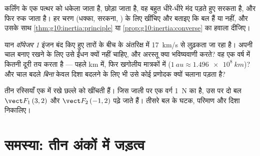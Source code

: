 \begin{exercise}[$\star\star\star$]\label{exo:g10:inertia:13}
कर्लिंग के एक पत्थर को धकेला जाता है, छोड़ा जाता है, वह बहुत धीरे-धीरे
मंद पड़ते हुए सरकता है, और फिर रुक जाता है। हर चरण (धक्का, सरकना, )
के लिए  खींचिए और बताइए कि बल
 हैं या नहीं, और उसके साथ \cref{thm:g10:inertia:principle} या \cref{prop:g10:inertia:converse} का हवाला
दीजिए।
\end{exercise}

\begin{exercise}[$\star\star\star$]\label{exo:g10:inertia:14}
यान \emph{वॉयेजर 1} इंजन बंद किए हुए तारों के बीच के अंतरिक्ष में \qty{17}{km/s}
से लुढ़कता जा रहा है। अपनी चाल बनाए रखने के लिए उसे ईंधन क्यों नहीं
चाहिए, और अरस्तू क्या भविष्यवाणी करते? वह एक वर्ष में कितनी दूरी तय करता
है --- पहले \unit{km} में, फिर खगोलीय मात्रकों में ($\qty{1}{au} \approx
\qty{1.496e8}{km}$)? और
चाल बदले \emph{बिना} केवल दिशा बदलने के लिए भी उसे कोई प्रणोदक क्यों
चलाना पड़ता है?
\end{exercise}

\begin{exercise}[$\star\star\star$]\label{exo:g10:inertia:15}
तीन रस्सियाँ एक  में रखे छल्ले को खींचती हैं। जिस जाली पर एक वर्ग
\qty{1}{N} का है, उस पर दो बल $\vect F_1\,(3, 2)$ और $\vect F_2\,(-1, 2)$ पढ़े जाते हैं।
तीसरे बल के घटक, परिमाण और दिशा निकालिए।
\end{exercise}

\section{समस्या: तीन अंकों में जड़त्व}

